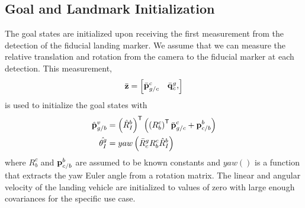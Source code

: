 
\subsection{Goal and Landmark Initialization}
The goal states are initialized upon receiving the first measurement from
the detection of the fiducial landing marker. We assume that we can measure the
relative translation and rotation from the camera to the fiducial marker
at each detection. This measurement,
\begin{equation}
  \bar{\vect{z}} =
  \begin{bmatrix}
    \bar{\vect{p}}_{g/c}^c & \bar{\vect{q}}_c^g,
  \end{bmatrix}
  \label{eq:fiducial_meas}
\end{equation}
is used to initialize the goal states with
\begin{align}
  \hat{\boldsymbol{\mathrm{p}}}_{g/b}^v &= \left( \hat{R}_I^b \right)^{\mathsf{T}} \left( \left ( R_b^c
  \right)^{\mathsf{T}} \bar{\boldsymbol{\mathrm{p}}}_{g/c}^c + \boldsymbol{\mathrm{p}}_{c/b}^b
\right)   \\
      \hat{\theta_I^g} &= yaw \left( \bar{R}_c^g R_b^c \hat{R}_I^b \right)
\end{align}
where $R_b^c$ and $\boldsymbol{\mathrm{p}}_{c/b}^b$ are assumed to be known constants and
$yaw()$ is a function that extracts the yaw Euler angle from a rotation matrix.
The linear and angular velocity of the landing vehicle are initialized to values
of zero with large enough covariances for the specific use case.

